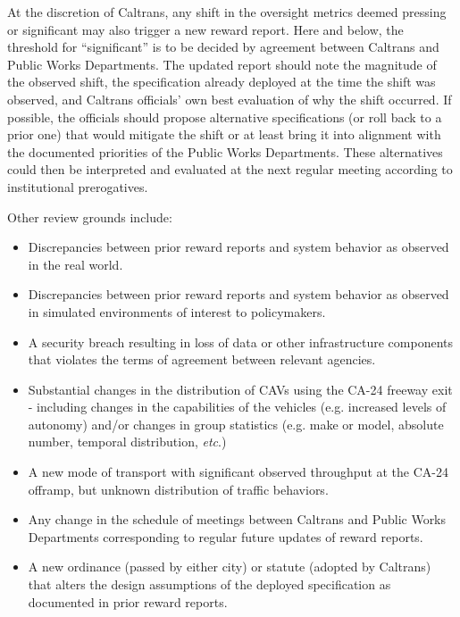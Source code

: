 \documentclass[12pt, a4paper, twocolumn]{article}
\begin{document}
\begin{multicols}{2}
{At the discretion of Caltrans, any shift in the oversight metrics deemed pressing or significant may also trigger a new reward report. Here and below, the threshold for ``significant'' is to be decided by agreement between Caltrans and Public Works Departments. The updated report should note the magnitude of the observed shift, the specification already deployed at the time the shift was observed, and Caltrans officials' own best evaluation of why the shift occurred. If possible, the officials should propose alternative specifications (or roll back to a prior one) that would mitigate the shift or at least bring it into alignment with the documented priorities of the Public Works Departments. These alternatives could then be interpreted and evaluated at the next regular meeting according to institutional prerogatives.

Other review grounds include:

\begin{itemize}

\item Discrepancies between prior reward reports and system behavior as observed in the real world.

\item Discrepancies between prior reward reports and system behavior as observed in simulated environments of interest to policymakers.

\item A security breach resulting in loss of data or other infrastructure components that violates the terms of agreement between relevant agencies.

\item Substantial changes in the distribution of CAVs using the CA-24 freeway exit - including changes in the capabilities of the vehicles (e.g. increased levels of autonomy) and/or changes in group statistics (e.g. make or model, absolute number, temporal distribution, \textit{etc}.)

\item A new mode of transport with significant observed throughput at the CA-24 offramp, but unknown distribution of traffic behaviors.

\item Any change in the schedule of meetings between Caltrans and Public Works Departments corresponding to regular future updates of reward reports.

\item A new ordinance (passed by either city) or statute (adopted by Caltrans) that alters the design assumptions of the deployed specification as documented in prior reward reports.


\end{itemize}}
\end{multicols}
\end{document}
